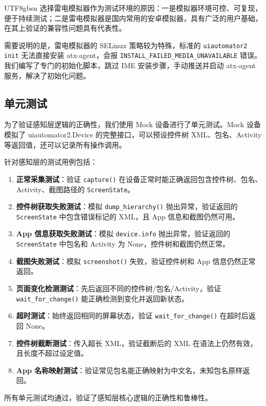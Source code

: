 \documentclass{article}
\begin{document}
\begin{CJK}{UTF8}{gbsn}
选择雷电模拟器作为测试环境的原因：一是模拟器环境可控、可复现，便于持续测试；二是雷电模拟器是国内常用的安卓模拟器，具有广泛的用户基础，在其上验证的兼容性问题具有代表性。

需要说明的是，雷电模拟器的 SELinux 策略较为特殊，标准的 \texttt{uiautomator2 init} 无法直接安装 atx-agent，会报 \texttt{INSTALL\_FAILED\_MEDIA\_UNAVAILABLE} 错误。我们编写了专门的初始化脚本，跳过 IME 安装步骤，手动推送并启动 atx-agent 服务，解决了初始化问题。

\subsection{单元测试}

为了验证感知层逻辑的正确性，我们使用 Mock 设备进行了单元测试。Mock 设备模拟了 uiautomator2.Device 的完整接口，可以预设控件树 XML、包名、Activity 等返回值，还可以记录所有操作调用。

针对感知层的测试用例包括：

\begin{enumerate}[leftmargin=1.5em]
  \item \textbf{正常采集测试}：验证 \texttt{capture()} 在设备正常时能正确返回包含控件树、包名、Activity、截图路径的 \texttt{ScreenState}。
  \item \textbf{控件树获取失败测试}：模拟 \texttt{dump\_hierarchy()} 抛出异常，验证返回的 \texttt{ScreenState} 中包含错误标记的 XML，且 App 信息和截图仍然可用。
  \item \textbf{App 信息获取失败测试}：模拟 \texttt{device.info} 抛出异常，验证返回的 \texttt{ScreenState} 中包名和 Activity 为 None，控件树和截图仍然正常。
  \item \textbf{截图失败测试}：模拟 \texttt{screenshot()} 失败，验证控件树和 App 信息仍然正常返回。
  \item \textbf{页面变化检测测试}：先后返回不同的控件树/包名/Activity，验证 \texttt{wait\_for\_change()} 能正确检测到变化并返回新状态。
  \item \textbf{超时测试}：始终返回相同的屏幕状态，验证 \texttt{wait\_for\_change()} 在超时后返回 None。
  \item \textbf{控件树截断测试}：传入超长 XML，验证截断后的 XML 在语法上仍然有效，且长度不超过设定值。
  \item \textbf{App 名称映射测试}：验证常见包名能正确映射为中文名，未知包名原样返回。
\end{enumerate}

所有单元测试均通过，验证了感知层核心逻辑的正确性和鲁棒性。


\end{CJK}
\end{document}

